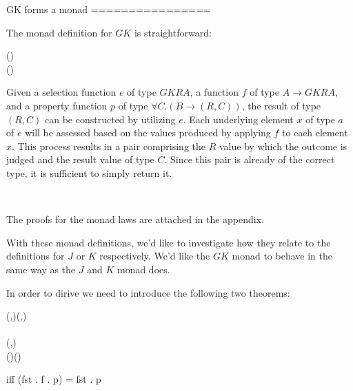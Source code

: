 GK forms a monad
================

The monad definition for $GK$ is straightforward:
\begin{hscode}\SaveRestoreHook
{}%
%
%
\>[3]{}\mathbin{::}\;\;\to (\to {}\;\;)\to {}\;\;\<[E]%
\\
\>[3]{}\;\;\;\mathrel{=}\;(\lambda {}\to {}\;\;){}\<[E]%
\ColumnHook
\end{hscode}\resethooks
Given a selection function $e$ of type $GK R A$, a function $f$ of type 
$A \rightarrow GK R A$, and a property function $p$ of type 
$\forall C. (B \rightarrow (R,C))$, the result of type $(R,C)$ can be constructed by 
utilizing $e$. Each underlying element $x$ of type $a$ of $e$ will be assessed based on 
the values produced by applying $f$ to each element $x$. This process results in a pair 
comprising the $R$ value by which the outcome is judged and the result value of type $C$. 
Since this pair is already of the correct type, it is sufficient to simply return it.
\begin{hscode}\SaveRestoreHook
{}%
%
%
\>[3]{}\mathbin{::}\to {}\;\;\<[E]%
\\
\>[3]{}\;\;\mathrel{=}\;\<[E]%
\ColumnHook
\end{hscode}\resethooks
The proofs for the monad laws are attached in the appendix.

With these monad definitions, we'd like to investigate how they relate to the definitions 
for $J$ or $K$ respectively. We'd like the $GK$ monad to behave in the same way as the $J$
and $K$ monad does.

In order to dirive we need to introduce the following two theorems:
\begin{theorem}[Theorem 1]
\begin{hscode}\SaveRestoreHook
{}%
%
\>[B]{}\mathbin{::}(,)\to (,){}\<[E]%
\\
\>[B]{}\mathbin{::}\;\;\<[E]%
\\
\>[B]{}\mathbin{::}\to (,){}\<[E]%
\\
\>[B]{}\;(\;)\mathrel{=}\;(\mathbin{\circ}){}\<[E]%
\ColumnHook
\end{hscode}\resethooks
iff (fst . f . p) = fst . p

\end{theorem}

